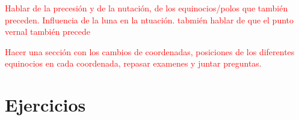 \begin{Anotacion}
    \textcolor{red}{Hablar de la precesión y de la nutación, de los equinocios/polos que también preceden. Influencia de la luna en la ntuación. tabmién hablar de que el punto vernal también precede}
\end{Anotacion}

\begin{Anotacion}
    \textcolor{red}{Hacer una sección con los cambios de coordenadas, posiciones de los diferentes equinocios en cada coordenada, repasar examenes y juntar preguntas.}
\end{Anotacion}





\section{Ejercicios}


